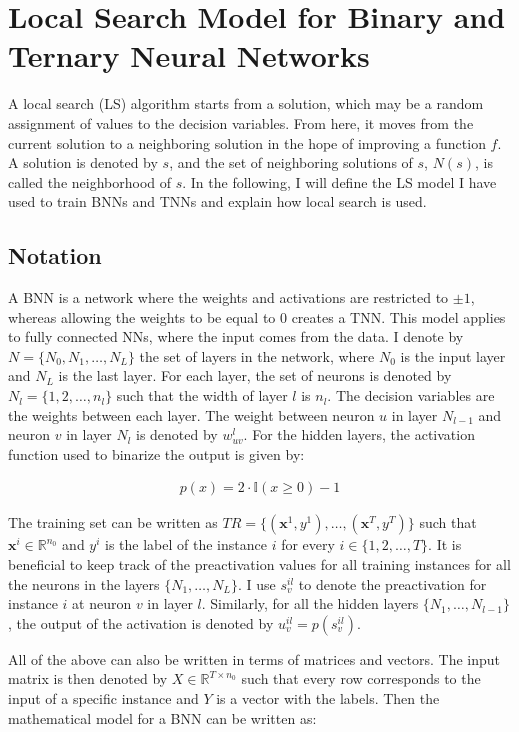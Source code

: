 \section{Local Search Model for Binary and Ternary Neural Networks}

A local search (LS) algorithm starts from a solution, which may be a random assignment of values to the decision variables. From here, it moves from the current solution to a neighboring solution in the hope of improving a function $f$. A solution is denoted by $s$, and the set of neighboring solutions of $s$, $N(s)$, is called the neighborhood of $s$. In the following, I will define the LS model I have used to train BNNs and TNNs and explain how local search is used. 

\subsection{Notation}
A BNN is a network where the weights and activations are restricted to $\pm 1$, whereas allowing the weights to be equal to 0 creates a TNN. This model applies to fully connected NNs, where the input comes from the data. I denote by $N = \{N_0, N_1, \ldots, N_L\}$ the set of layers in the network, where $N_0$ is the input layer and $N_L$ is the last layer. For each layer, the set of neurons is denoted by $N_l = \{1, 2, \ldots, n_l\}$ such that the width of layer $l$ is $n_l$. The decision variables are the weights between each layer. The weight between neuron $u$ in layer $N_{l-1}$ and neuron $v$ in layer $N_l$ is denoted by $w_{uv}^l$. For the hidden layers, the activation function used to binarize the output is given by: 

\begin{align}
    \label{act} p(x) = 2 \cdot \mathbb{I} (x \geq 0) - 1
\end{align}

\noindent The training set can be written as $TR = \{ (\mathbf{x}^1, y^1), \ldots , (\mathbf{x}^T, y^T) \}$ such that $\mathbf{x}^i \in \mathbb{R}^{n_0}$ and $y^i$ is the label of the instance $i$ for every $i\in \{1, 2, \ldots, T\}$. It is beneficial to keep track of the preactivation values for all training instances for all the neurons in the layers $\{N_1, \ldots, N_L\}$. I use $s_v^{il}$ to denote the preactivation for instance $i$ at neuron $v$ in layer $l$. Similarly, for all the hidden layers $\{N_1, \ldots, N_{l-1}\}$, the output of the activation is denoted by $u_v^{il} = p(s_v ^{il})$. 

\noindent All of the above can also be written in terms of matrices and vectors. The input matrix is then denoted by $X \in \mathbb{R}^{T \times n_0}$ such that every row corresponds to the input of a specific instance and $Y$ is a vector with the labels. Then the mathematical model for a BNN can be written as:


